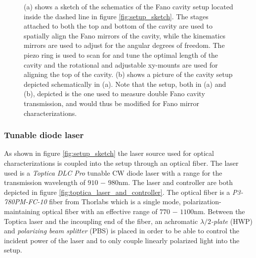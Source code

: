 \begin{figure}[h!]
\begin{subfigure}[b]{0.27\textwidth}
    \end{subfigure}
    \caption{(a) shows a sketch of the schematics of the Fano cavity setup located inside the dashed line in figure \ref{fig:setup_sketch}. The stages attached to both the top and bottom of the cavity are used to spatially align the Fano mirrors of the cavity, while the kinematics mirrors are used to adjust for the angular degrees of freedom. The piezo ring is used to scan for and tune the optimal length of the cavity and the rotational and adjustable xy-mounts are used for aligning the top of the cavity. (b) shows a picture of the cavity setup depicted schematically in (a). Note that the setup, both in (a) and (b), depicted is the one used to measure double Fano cavity transmission, and would thus be modified for Fano mirror characterizations.}
    \label{fig:cavity_setup}
\end{figure}

\subsubsection{Tunable diode laser}

As shown in figure \ref{fig:setup_sketch} the laser source used for optical characterizations is coupled into the setup through an optical fiber. The laser used is a \emph{Toptica DLC Pro} tunable CW diode laser with a range for the transmission wavelength of $910$ $-$ $980$nm\cite{Toptica_laser}. The laser and controller are both depicted in figure \ref{fig:toptica_laser_and_controller}. The optical fiber is a \emph{P3-780PM-FC-10} fiber from Thorlabs which is a single mode, polarization-maintaining optical fiber with an effective range of $770$ $-$ $1100$nm\cite{single_mode_fiber}. Between the Toptica laser and the incoupling end of the fiber, an achromatic $\lambda/2$\emph{-plate} (HWP) and \emph{polarizing beam splitter} (PBS) is placed in order to be able to control the incident power of the laser and to only couple linearly polarized light into the setup.  

